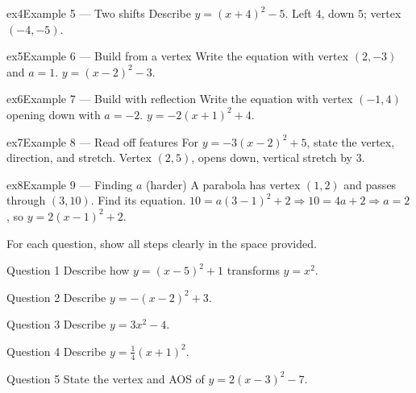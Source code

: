\documentclass[11pt]{article}
\begin{document}
\begin{example}{ex4}{Example 5 --- Two shifts}
Describe $y=(x+4)^2-5$.
\soln Left $4$, down $5$; vertex $(-4,-5)$.
\end{example}

\begin{example}{ex5}{Example 6 --- Build from a vertex}
Write the equation with vertex $(2,-3)$ and $a=1$.
\soln $y=(x-2)^2-3.$
\end{example}

\begin{example}{ex6}{Example 7 --- Build with reflection}
Write the equation with vertex $(-1,4)$ opening down with $a=-2$.
\soln $y=-2(x+1)^2+4.$
\end{example}

\begin{example}{ex7}{Example 8 --- Read off features}
For $y=-3(x-2)^2+5$, state the vertex, direction, and stretch.
\soln Vertex $(2,5)$, opens down, vertical stretch by $3$.
\end{example}

\begin{example}{ex8}{Example 9 --- Finding $a$ (harder)}
A parabola has vertex $(1,2)$ and passes through $(3,10)$. Find its equation.
\soln $10=a(3-1)^2+2\Rightarrow 10=4a+2\Rightarrow a=2$, so $y=2(x-1)^2+2.$
\end{example}

\clearpage
{}
For each question, show all steps clearly in the space provided.

\begin{qbox}{Question 1}
Describe how $y=(x-5)^2+1$ transforms $y=x^2$.\workspace{2.0cm}
\end{qbox}

\begin{qbox}{Question 2}
Describe $y=-(x-2)^2+3$.\workspace{2.0cm}
\end{qbox}

\begin{qbox}{Question 3}
Describe $y=3x^2-4$.\workspace{2.0cm}
\end{qbox}

\begin{qbox}{Question 4}
Describe $y=\tfrac14(x+1)^2$.\workspace{2.0cm}
\end{qbox}

\begin{qbox}{Question 5}
State the vertex and AOS of $y=2(x-3)^2-7$.\workspace{2.0cm}
\end{qbox}
\end{document}
